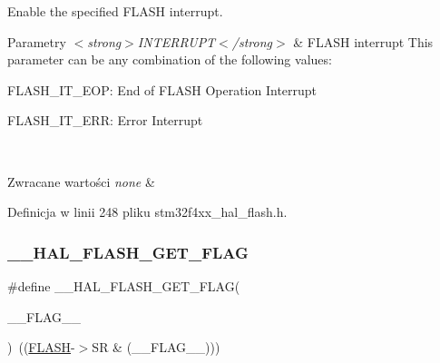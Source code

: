 Enable the specified F\+L\+A\+SH interrupt. 


\begin{DoxyParams}{Parametry}
{\em $<$strong$>$\+I\+N\+T\+E\+R\+R\+U\+P\+T$<$/strong$>$} & F\+L\+A\+SH interrupt This parameter can be any combination of the following values\+: \begin{DoxyItemize}
\item F\+L\+A\+S\+H\+\_\+\+I\+T\+\_\+\+E\+OP\+: End of F\+L\+A\+SH Operation Interrupt \item F\+L\+A\+S\+H\+\_\+\+I\+T\+\_\+\+E\+RR\+: Error Interrupt \end{DoxyItemize}
\\
\hline
\end{DoxyParams}

\begin{DoxyRetVals}{Zwracane wartości}
{\em none} & \\
\hline
\end{DoxyRetVals}


Definicja w linii 248 pliku stm32f4xx\+\_\+hal\+\_\+flash.\+h.

\mbox{\label{group___f_l_a_s_h___exported___macros_ga0d3dd161fecc0e47c9e109c7c28672c1}} 
\subsubsection{\texorpdfstring{\+\_\+\+\_\+\+H\+A\+L\+\_\+\+F\+L\+A\+S\+H\+\_\+\+G\+E\+T\+\_\+\+F\+L\+AG}{\_\_HAL\_FLASH\_GET\_FLAG}}
{\footnotesize\ttfamily \#define \+\_\+\+\_\+\+H\+A\+L\+\_\+\+F\+L\+A\+S\+H\+\_\+\+G\+E\+T\+\_\+\+F\+L\+AG(\begin{DoxyParamCaption}\item[{}]{\+\_\+\+\_\+\+F\+L\+A\+G\+\_\+\+\_\+ }\end{DoxyParamCaption})~((\hyperlink{group___peripheral__declaration_ga844ea28ba1e0a5a0e497f16b61ea306b}{F\+L\+A\+SH}-\/$>$SR \& (\+\_\+\+\_\+\+F\+L\+A\+G\+\_\+\+\_\+)))}



